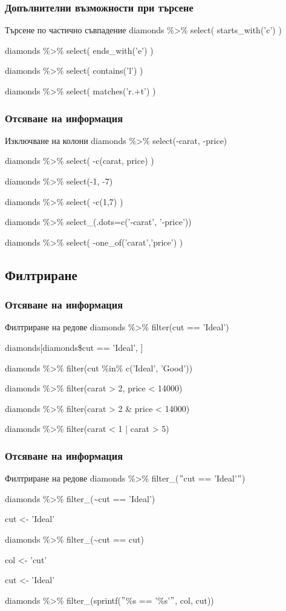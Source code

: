 \documentclass{beamer}
\begin{document}
\begin{frame}
\frametitle{Допълнителни възможности при търсене}
\begin{block}{Търсене по частично съвпадение}
diamonds \%>\% select( starts\_with('c') )

diamonds \%>\% select( ends\_with('e') )

diamonds \%>\% select( contains('l') )

diamonds \%>\% select( matches('r.+t') )
\end{block}
\end{frame}

\begin{frame}
\frametitle{Отсяване на информация}
\begin{block}{Изключване на колони}
diamonds \%>\% select(-carat, -price)

diamonds \%>\% select( -c(carat, price) )

diamonds \%>\% select(-1, -7)

diamonds \%>\% select( -c(1,7) )

diamonds \%>\% select\_(.dots=c('-carat', '-price'))

diamonds \%>\% select( -one\_of('carat','price') )
\end{block}
\end{frame}

\subsection{Филтриране}

\begin{frame}
\frametitle{Отсяване на информация}
\begin{block}{Филтриране на редове}
diamonds \%>\% filter(cut == 'Ideal')

diamonds[diamonds\$cut == 'Ideal', ]

diamonds \%>\% filter(cut \%in\% c('Ideal', 'Good'))

diamonds \%>\% filter(carat > 2, price < 14000)

diamonds \%>\% filter(carat > 2 \& price < 14000)

diamonds \%>\% filter(carat < 1 | carat > 5)
\end{block}
\end{frame}

\begin{frame}
\frametitle{Отсяване на информация}
\begin{block}{Филтриране на редове}
diamonds \%>\% filter\_($"$cut == 'Ideal'$"$)

diamonds \%>\% filter\_(\textasciitilde cut == 'Ideal')

cut <- 'Ideal'

diamonds \%>\% filter\_(\textasciitilde cut == cut)

col <- 'cut'

cut <- 'Ideal'

diamonds \%>\% filter\_(sprintf($"$\%s == '\%s'$"$, col, cut))
\end{block}
\end{frame}
\end{document}
